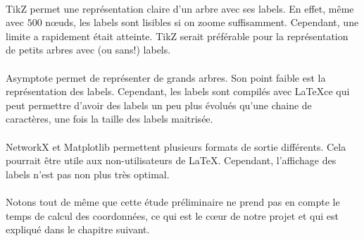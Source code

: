 \paragraph{}TikZ permet une représentation claire d'un arbre avec ses labels. En effet, même avec $500$ n\oe uds, les labels sont lisibles si on zoome suffisamment. Cependant, une limite a rapidement était atteinte. TikZ serait préférable pour la représentation de petits arbres avec (ou sans!) labels.
\paragraph{}Asymptote permet de représenter de grands arbres. Son point faible est la représentation des labels. Cependant, les labels sont compilés avec \LaTeX ce qui peut permettre d'avoir des labels un peu plus évolués qu'une chaine de caractères, une fois la taille des labels maitrisée.
\paragraph{}NetworkX et Matplotlib permettent plusieurs formats de sortie différents. Cela pourrait être utile aux non-utilisateurs de \LaTeX . Cependant, l'affichage des labels n'est pas non plus très optimal.
\paragraph{}Notons tout de même que cette étude préliminaire ne prend pas en compte le temps de calcul des coordonnées, ce qui est le c\oe ur de notre projet et qui est expliqué dans le chapitre suivant.

